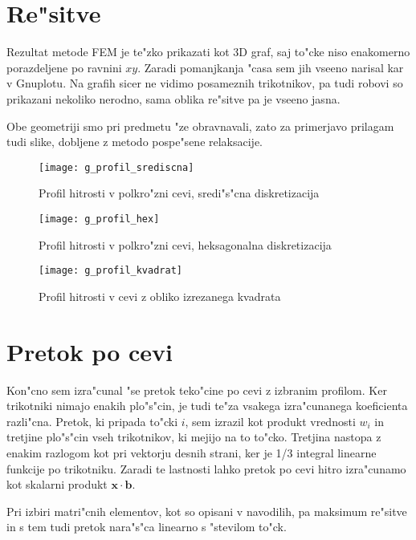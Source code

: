 \documentclass[a4paper,10pt]{article}
\renewcommand{\vec}{\mathbf}
\begin{document}
\section{Re"sitve}

Rezultat metode FEM je te"zko prikazati kot 3D graf, saj to"cke niso enakomerno porazdeljene po ravnini $xy$. Zaradi pomanjkanja "casa sem jih vseeno narisal kar v Gnuplotu. Na grafih sicer ne vidimo posameznih trikotnikov, pa tudi robovi so prikazani nekoliko nerodno, sama oblika re"sitve pa je vseeno jasna. 

Obe geometriji smo pri predmetu "ze obravnavali, zato za primerjavo prilagam tudi slike, dobljene z metodo pospe"sene relaksacije. 

\begin{figure}[H]
 \texttt{[image: g\_profil\_srediscna]}
 \caption{Profil hitrosti v polkro"zni cevi, sredi"s"cna diskretizacija}
 \label{fig:profil-srediscna}
\end{figure}

\begin{figure}[H]
 \texttt{[image: g\_profil\_hex]}
 \caption{Profil hitrosti v polkro"zni cevi, heksagonalna diskretizacija}
 \label{fig:profil-heksagonalna}
\end{figure}

\begin{figure}[H]
 \texttt{[image: g\_profil\_kvadrat]}
 \caption{Profil hitrosti v cevi z obliko izrezanega kvadrata}
 \label{fig:profil-kvadrat}
\end{figure}


\section{Pretok po cevi}

Kon"cno sem izra"cunal "se pretok teko"cine po cevi z izbranim profilom. Ker trikotniki nimajo enakih plo"s"cin, je tudi te"za vsakega izra"cunanega koeficienta razli"cna. Pretok, ki pripada to"cki $i$, sem izrazil kot produkt vrednosti $w_i$ in tretjine plo"s"cin vseh trikotnikov, ki mejijo na to to"cko. Tretjina nastopa z enakim razlogom kot pri vektorju desnih strani, ker je 1/3 integral linearne funkcije po trikotniku. Zaradi te lastnosti lahko pretok po cevi hitro izra"cunamo kot skalarni produkt $\vec x \cdot \vec b$.  

Pri izbiri matri"cnih elementov, kot so opisani v navodilih, pa maksimum re"sitve in s tem tudi pretok nara"s"ca linearno s "stevilom to"ck. 
\end{document}
